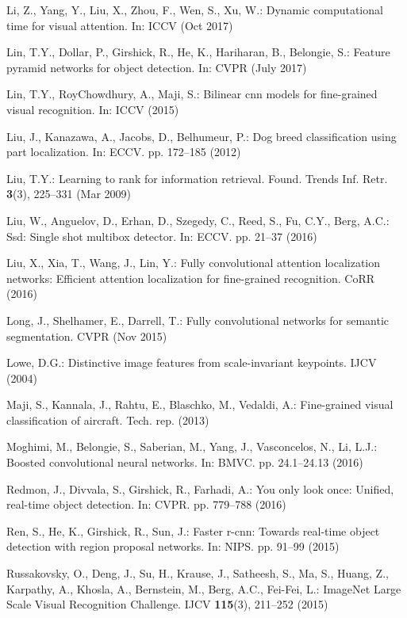 \documentclass[runningheads]{llncs}
\begin{document}
\begin{thebibliography}{10}
Li, Z., Yang, Y., Liu, X., Zhou, F., Wen, S., Xu, W.: Dynamic computational
  time for visual attention. In: ICCV (Oct 2017)

Lin, T.Y., Dollar, P., Girshick, R., He, K., Hariharan, B., Belongie, S.:
  Feature pyramid networks for object detection. In: CVPR (July 2017)

Lin, T.Y., RoyChowdhury, A., Maji, S.: Bilinear cnn models for fine-grained
  visual recognition. In: ICCV (2015)

Liu, J., Kanazawa, A., Jacobs, D., Belhumeur, P.: Dog breed classification
  using part localization. In: ECCV. pp. 172--185 (2012)

Liu, T.Y.: Learning to rank for information retrieval. Found. Trends Inf. Retr.
   \textbf{3}(3),  225--331 (Mar 2009)

Liu, W., Anguelov, D., Erhan, D., Szegedy, C., Reed, S., Fu, C.Y., Berg, A.C.:
  Ssd: Single shot multibox detector. In: ECCV. pp. 21--37 (2016)

Liu, X., Xia, T., Wang, J., Lin, Y.: Fully convolutional attention localization
  networks: Efficient attention localization for fine-grained recognition. CoRR
   (2016)

Long, J., Shelhamer, E., Darrell, T.: Fully convolutional networks for semantic
  segmentation. CVPR  (Nov 2015)

Lowe, D.G.: Distinctive image features from scale-invariant keypoints. IJCV
  (2004)

Maji, S., Kannala, J., Rahtu, E., Blaschko, M., Vedaldi, A.: Fine-grained
  visual classification of aircraft. Tech. rep. (2013)

Moghimi, M., Belongie, S., Saberian, M., Yang, J., Vasconcelos, N., Li, L.J.:
  Boosted convolutional neural networks. In: BMVC. pp. 24.1--24.13 (2016)

Redmon, J., Divvala, S., Girshick, R., Farhadi, A.: You only look once:
  Unified, real-time object detection. In: CVPR. pp. 779--788 (2016)

Ren, S., He, K., Girshick, R., Sun, J.: Faster r-cnn: Towards real-time object
  detection with region proposal networks. In: NIPS. pp. 91--99 (2015)

Russakovsky, O., Deng, J., Su, H., Krause, J., Satheesh, S., Ma, S., Huang, Z.,
  Karpathy, A., Khosla, A., Bernstein, M., Berg, A.C., Fei-Fei, L.: {ImageNet
  Large Scale Visual Recognition Challenge}. IJCV  \textbf{115}(3),  211--252
  (2015)


\end{thebibliography}
\end{document}
